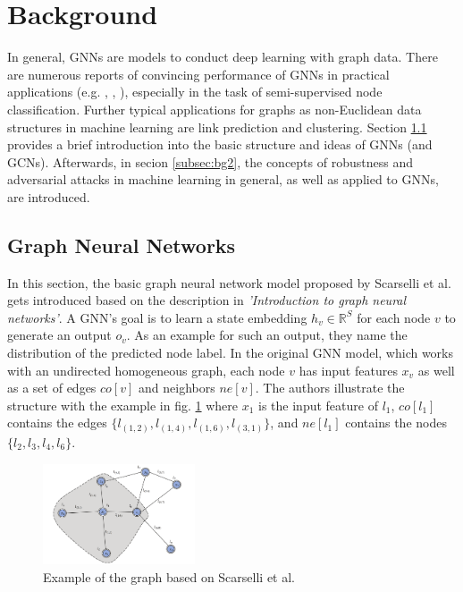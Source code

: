 \documentclass[a4paper,preprint]{sig-alternate}
\begin{document}
\vfill
\pagebreak

\section{Background}
\label{sec:background}

In general, GNNs are models to conduct deep learning with graph data.
There are numerous reports of convincing performance of GNNs in practical applications (e.g. \cite{NIPS2015_f9be311e},
\cite{hamilton2018inductive}, \cite{trivedi2017knowevolve}), especially in the task of semi-supervised node classification. \cite{xu2019topology}
Further typical applications for graphs as non-Euclidean data structures in machine learning are link prediction and clustering. \cite{Zhou_2019}
Section \ref{subsec:bg1} provides a brief introduction into the basic structure and ideas of GNNs (and GCNs). Afterwards, in secion
\ref{subsec:bg2}, the concepts of robustness and adversarial attacks in machine learning in general, as well as applied to GNNs, are introduced.\newline

\subsection{Graph Neural Networks}
\label{subsec:bg1}

In this section, the basic graph neural network model proposed by Scarselli et al. \cite{Scarselli_2009} gets introduced
based on the description in \textit{'Introduction to graph neural networks'}\cite{Liu_2020}.
A GNN's goal is to learn a state embedding $h_v \in \mathbb{R}^S$ for each node $v$ to generate an output $o_v$.
As an example for such an output, they name the distribution of the predicted node label.
In the original GNN model, which works with an undirected homogeneous graph, each node $v$ has input features $x_v$
as well as a set of edges $co[v]$ and neighbors $ne[v]$. 
The authors illustrate the structure with the example in fig. \ref{fig:graph}
where $x_{1}$ is the input feature of $l_1$, $co[l_1]$ contains the edges $\{l_{(1, 2)}, l_{(1, 4)}, l_{(1, 6)}, l_{(3, 1)}\}$, and 
$ne[l_1]$ contains the nodes $\{l_2, l_3, l_4, l_6\}$.

\begin{figure}[h]
    \centering
    \includegraphics[width=0.4\textwidth]{img/graph.png}
    \caption{Example of the graph based on Scarselli et al. \cite{Liu_2020}}
    \label{fig:graph}
\end{figure}
\end{document}
